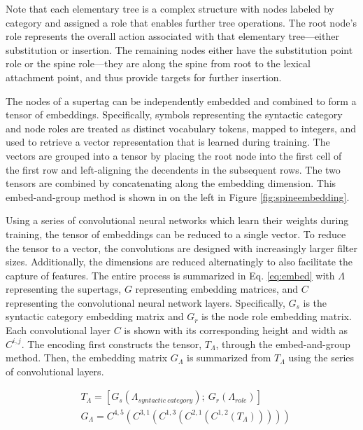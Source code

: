 \documentclass[11pt]{article}
\begin{document}
Note that each elementary tree is a complex structure with nodes
labeled by category and assigned a role that enables further tree
operations.
%
The root node's role represents the overall action associated with
that elementary tree---either substitution or insertion.
%
The remaining nodes either have the substitution point role or the
spine role---they are along the spine from root to the lexical
attachment point, and thus provide targets for further insertion.

The nodes of a supertag can be independently embedded and combined to form a
tensor of embeddings.
%
Specifically, symbols representing the syntactic category and node roles are treated as
distinct vocabulary tokens, mapped to integers, and used to retrieve a vector
representation that is learned during training.
%
The vectors are grouped into a tensor by placing the root node into the
first cell of the first row and left-aligning the decendents in the subsequent rows.
%
The two tensors are combined by concatenating along the embedding dimension.
%
This embed-and-group method is shown in on the left in Figure \ref{fig:spineembedding}.


Using a series of convolutional neural networks which learn their weights during training, the tensor of embeddings can be reduced to a single vector.
%
To reduce the tensor to a vector, the convolutions are designed with increasingly larger filter sizes.
%
Additionally, the dimensions are reduced alternatingly to also facilitate the capture of features.
%
The entire process is summarized in Eq. \ref{eq:embed} with $\Lambda$ representing the supertags, $G$ representing embedding matrices, and
$C$ representing the convolutional neural network layers.
%
Specifically, $G_s$ is the syntactic category embedding matrix and
$G_r$ is the node role embedding matrix.
%
Each convolutional layer $C$ is shown with its corresponding height and width as $C^{i,j}$.
%
The encoding first constructs the tensor, $T_\Lambda$, through the embed-and-group method.
%
Then, the embedding matrix $G_\Lambda$ is summarized from $T_\Lambda$ using the
series of convolutional layers.

\begin{align}
& T_\Lambda = [G_s(\Lambda_{syntactic~category});~G_r(\Lambda_{role})] \nonumber \\
& G_\Lambda = C^{4,5}(C^{3,1}(C^{1,3}(C^{2,1}(C^{1,2}(T_\Lambda))))) \label{eq:embed}
\end{align}
\end{document}
